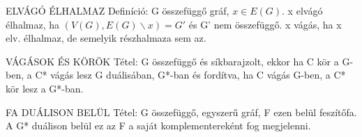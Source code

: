 \documentclass[]{article}
\begin{document}
\begin{shaded}
ELVÁGÓ ÉLHALMAZ Definíció: G összefüggő gráf, $x \in E(G)$. x elvágó élhalmaz, ha $(V(G),E(G)\backslash x) = G'$ és G' nem összefüggő. x vágás, ha x elv. élhalmaz, de semelyik részhalmaza sem az.
\end{shaded}
\begin{framed}
VÁGÁSOK ÉS KÖRÖK Tétel: G összefüggő és síkbarajzolt, ekkor ha C kör a G-ben, a C* vágás lesz G duálisában, G*-ban és fordítva, ha C vágás G-ben, a C* kör lesz a G*-ban.
\end{framed}
\begin{framed}
FA DUÁLISON BELÜL Tétel: G összefüggő, egyszerű gráf, F ezen belül feszítőfa. A G* duálison belül ez az F a saját komplementereként fog megjelenni.
\end{framed}
\end{document}
